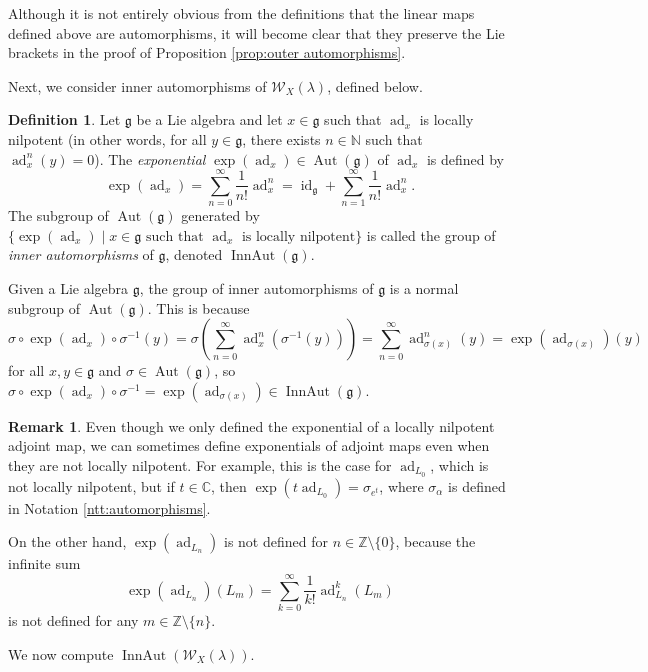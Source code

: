 \documentclass[11pt, svgnames]{amsart}
\DeclareMathOperator{\ad}{ad}
\newcommand{\g}{\ensuremath{\mathfrak{g}}}
\newcommand{\ZZ}{\mathbb{Z}}
\newcommand{\CC}{\mathbb{C}}
\newcommand{\NN}{\mathbb{N}}
\newcommand{\W}{\mathcal{W}}
\DeclareMathOperator{\id}{id}
\DeclareMathOperator{\Aut}{Aut}
\DeclareMathOperator{\InnAut}{InnAut}
\newcommand{\nonzero}{\setminus \{0\}}
\theoremstyle{definition}
\newtheorem{defn}[proposition]{Definition}
\newtheorem{remark}[proposition]{Remark}
\begin{document}
Although it is not entirely obvious from the definitions that the linear maps defined above are automorphisms, it will become clear that they preserve the Lie brackets in the proof of Proposition \ref{prop:outer automorphisms}.

Next, we consider inner automorphisms of $\W_X(\lambda)$, defined below.

\begin{defn}
    Let $\g$ be a Lie algebra and let $x \in \g$ such that $\ad_x$ is locally nilpotent (in other words, for all $y \in \g$, there exists $n \in \NN$ such that $\ad_x^n(y) = 0$). The \emph{exponential} $\exp(\ad_x) \in \Aut(\g)$ of $\ad_x$ is defined by
    $$\exp(\ad_x) = \sum_{n = 0}^\infty \frac{1}{n!}\ad_x^n = \id_\g + \sum_{n = 1}^\infty \frac{1}{n!}\ad_x^n.$$
    The subgroup of $\Aut(\g)$ generated by $\{\exp(\ad_x) \mid x \in \g \text{ such that } \ad_x \text{ is locally nilpotent}\}$ is called the group of \emph{inner automorphisms} of $\g$, denoted $\InnAut(\g)$.
\end{defn}

Given a Lie algebra $\g$, the group of inner automorphisms of $\g$ is a normal subgroup of $\Aut(\g)$. This is because
$$\sigma \circ \exp(\ad_x) \circ \sigma^{-1}(y) = \sigma\left(\sum_{n=0}^\infty \ad_x^n(\sigma^{-1}(y))\right) = \sum_{n=0}^\infty \ad_{\sigma(x)}^n(y) = \exp(\ad_{\sigma(x)})(y)$$
for all $x,y \in \g$ and $\sigma \in \Aut(\g)$, so $\sigma \circ \exp(\ad_x) \circ \sigma^{-1} = \exp(\ad_{\sigma(x)}) \in \InnAut(\g)$.

\begin{remark}\label{rem:exp(L0)}
    Even though we only defined the exponential of a locally nilpotent adjoint map, we can sometimes define exponentials of adjoint maps even when they are not locally nilpotent. For example, this is the case for $\ad_{L_0}$, which is not locally nilpotent, but if $t \in \CC$, then $\exp(t \ad_{L_0}) = \sigma_{e^t}$, where $\sigma_\alpha$ is defined in Notation \ref{ntt:automorphisms}.

    On the other hand, $\exp(\ad_{L_n})$ is not defined for $n \in \ZZ \nonzero$, because the infinite sum
    $$\exp(\ad_{L_n})(L_m) = \sum_{k=0}^\infty \frac{1}{k!}\ad_{L_n}^k(L_m)$$
    is not defined for any $m \in \ZZ \setminus \{n\}$.
\end{remark}

We now compute $\InnAut(\W_X(\lambda))$.
\end{document}
